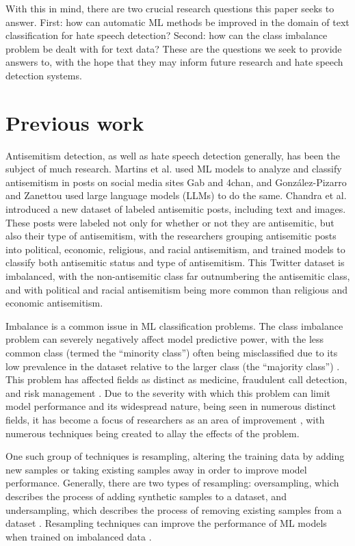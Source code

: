 \documentclass[runningheads]{llncs}
\begin{document}
With this in mind, there are two crucial research questions this paper seeks to answer. First: how can automatic ML methods be improved in the domain of text classification for hate speech detection? Second: how can the class imbalance problem be dealt with for text data? These are the questions we seek to provide answers to, with the hope that they may inform future research and hate speech detection systems.

\section{Previous work}
Antisemitism detection, as well as hate speech detection generally, has been the subject of much research. Martins et al. \cite{martins} used ML models to analyze and classify antisemitism in posts on social media sites Gab and 4chan, and González-Pizarro and Zanettou \cite{gonzalez} used large language models (LLMs) to do the same. Chandra et al. \cite{chandra} introduced a new dataset of labeled antisemitic posts, including text and images. These posts were labeled not only for whether or not they are antisemitic, but also their type of antisemitism, with the researchers grouping antisemitic posts into political, economic, religious, and racial antisemitism, and trained models to classify both antisemitic status and type of antisemitism. This Twitter dataset is imbalanced, with the non-antisemitic class far outnumbering the antisemitic class, and with political and racial antisemitism being more common than religious and economic antisemitism.

Imbalance is a common issue in ML classification problems. The class imbalance problem can severely negatively affect model predictive power, with the less common class (termed the ``minority class'') often being misclassified due to its low prevalence in the dataset relative to the larger class (the ``majority class'') \cite{abdelrahman}. This problem has affected fields as distinct as medicine, fraudulent call detection, and risk management \cite{sun}. Due to the severity with which this problem can limit model performance and its widespread nature, being seen in numerous distinct fields, it has become a focus of researchers as an area of improvement \cite{abdelrahman}, with numerous techniques being created to allay the effects of the problem.

One such group of techniques is resampling, altering the training data by adding new samples or taking existing samples away in order to improve model performance. Generally, there are two types of resampling: oversampling, which describes the process of adding synthetic samples to a dataset, and undersampling, which describes the process of removing existing samples from a dataset \cite{shelke}. Resampling techniques can improve the performance of ML models when trained on imbalanced data \cite{lee} \cite{khushi}.
\end{document}
